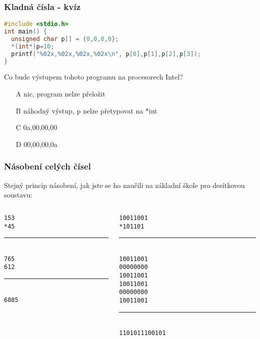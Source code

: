 \documentclass{beamer}
\begin{document}
\begin{frame}[fragile]
\frametitle{Kladná čísla - kvíz}
\begin{lstlisting}[language={C},columns=flexible]
#include <stdio.h>
int main() {
  unsigned char p[] = {0,0,0,0};
  *(int*)p=10;
  printf("%02x,%02x,%02x,%02x\n", p[0],p[1],p[2],p[3]);
}
\end{lstlisting}

Co bude výstupem tohoto programu na procesorech Intel?
\begin{itemize}
\item[A] nic, program nelze přeložit
\item[B] náhodný výstup, p  nelze přetypovat na *int
\item[C] 0a,00,00,00 
\item[D] 00,00,00,0a
\end{itemize}
\end{frame}



\begin{frame}
\frametitle{Násobení celých čísel}

Stejný princip násobení, jak jste se ho naučili na základní škole pro desítkovou soustavu:
\begin{columns}
\begin{column}{0.4\textwidth}
\texttt{\phantom{xxx}153}\\
\texttt{\phantom{xxx}*45}\\
\vspace{-8pt}
\rule[0]{1.5cm}{0.1pt}\\
\texttt{\phantom{xxx}765}\\
\texttt{\phantom{xx}612 }\\
\vspace{-8pt}
\rule[0]{1.5cm}{0.1pt}\\
\texttt{\phantom{xx}6885}\\
\end{column}
\hfill
\begin{column}{0.4\textwidth}
\texttt{\phantom{xxxxxx}10011001}\\
\texttt{\phantom{xxxxxxx}*101101}\\
\vspace{-8pt}
\rule[0]{3cm}{0.4pt}\\
\texttt{\phantom{xxxxxx}10011001}\\
\texttt{\phantom{xxxxx}00000000}\\
\texttt{\phantom{xxxx}10011001}\\
\texttt{\phantom{xxx}10011001}\\
\texttt{\phantom{xx}00000000}\\
\texttt{\phantom{x}10011001}\\
\vspace{-8pt}
\rule[0]{3cm}{0.4pt}\\
\texttt{\phantom{x}1101011100101}\\
\end{column}
\end{columns}

\end{frame}
\end{document}
